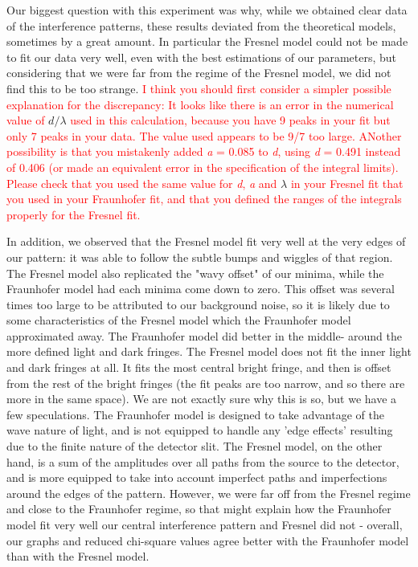 \documentclass[prb,preprint]{revtex4-1}
\begin{document}
Our biggest question with this experiment was why, while we obtained clear data of the interference patterns, these results deviated from the theoretical models, sometimes by a great amount.  In particular the Fresnel model could not be made to fit our data very well, even with the best estimations of our parameters, but considering that we were far from the regime of the Fresnel model, we did not find this to be too strange. \textcolor{red}{I think you should first consider a simpler possible explanation for the discrepancy: It looks like there is an error in the numerical value of }$d/{\lambda}$ \textcolor{red}{used in this calculation, because you have 9 peaks in your fit but only 7 peaks in your data. The value used appears to be 9/7 too large. ANother possibility is that you mistakenly added \textit{a}  = 0.085 to \textit{d},  using \textit{d} = 0.491 instead of 0.406 (or made an equivalent error in the specification of the integral limits).  Please check that you used the same value for \textit{d}, \textit{a} and }$\lambda$ \textcolor{red}{in your Fresnel fit that you used in your Fraunhofer fit, and that you defined the ranges of the integrals properly for the Fresnel fit. }

In addition, we observed that the Fresnel model fit very well at the very edges of our pattern:  it was able to follow the subtle bumps and wiggles of that region.  The Fresnel model also replicated the "wavy offset" of our minima, while the Fraunhofer model had each minima come down to zero.  This offset was several times too large to be attributed to our background noise, so it is likely due to some characteristics of the Fresnel model which the Fraunhofer model approximated away.  The Fraunhofer model did better in the middle- around the more defined light and dark fringes.  The Fresnel model does not fit the inner light and dark fringes at all.  It fits the most central bright fringe, and then is offset from the rest of the bright fringes (the fit peaks are too narrow, and so there are more in the same space).  We are not exactly sure why this is so, but we have a few speculations.    The Fraunhofer model is designed to take advantage of the wave nature of light, and is not equipped to handle any 'edge effects' resulting due to the finite nature of the detector slit.  The Fresnel model, on the other hand, is a sum of the amplitudes over all paths from the source to the detector, and is more equipped to take into account imperfect paths and imperfections around the edges of the pattern.   However, we were far off from the Fresnel regime and close to the Fraunhofer regime, so that might explain how the Fraunhofer model fit very well our central interference pattern and Fresnel did not - overall, our graphs and reduced chi-square values agree better with the Fraunhofer model than with the Fresnel model.  \cite{teachspin}
\end{document}
